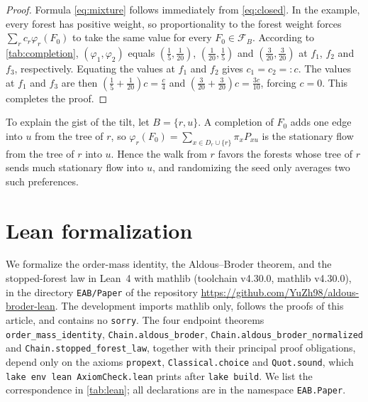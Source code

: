 \documentclass[onefignum,onetabnum]{siamart250211}
\numberwithin{theorem}{section}
\numberwithin{equation}{section}
\begin{document}
\begin{proof}
Formula \eqref{eq:mixture} follows immediately from \eqref{eq:closed}. In the example, every forest
has positive weight, so proportionality to the forest weight forces
$\sum_rc_r\varphi_r(F_0)$ to take the same value for every $F_0\in\mathcal F_B$. According to \cref{tab:completion}, $(\varphi_1,\varphi_2)$ equals
$(\tfrac15,\tfrac1{20})$, $(\tfrac1{20},\tfrac15)$ and
$(\tfrac3{20},\tfrac3{20})$ at $f_1$, $f_2$ and $f_3$, respectively. Equating the values at $f_1$ and
$f_2$ gives $c_1=c_2=:c$. The values at $f_1$ and $f_3$ are then
$(\tfrac15+\tfrac1{20})c=\tfrac c4$ and $(\tfrac3{20}+\tfrac3{20})c=\tfrac{3c}{10}$, forcing $c=0$. This completes the proof.
\end{proof}

To explain the gist of the tilt, let $B=\{r,u\}$. A completion of $F_0$ adds one
edge into $u$ from the tree of $r$, so
$\varphi_r(F_0)=\sum_{x\in D_r\cup\{r\}}\pi_xP_{xu}$ is the stationary
flow from the tree of $r$ into $u$. Hence the walk from $r$ favors the
forests whose tree of $r$ sends much stationary flow into $u$, and
randomizing the seed only averages two such preferences.

\section{Lean formalization}\label{sec:sm-lean}

\begin{sloppypar}
We formalize the order-mass identity, the Aldous--Broder theorem,
and the stopped-forest law in Lean~4
\cite{deMouraUllrich2021} with mathlib \cite{mathlib2020} (toolchain
v4.30.0, mathlib v4.30.0), in the directory \texttt{EAB/Paper}
of the repository \url{https://github.com/YuZh98/aldous-broder-lean}. The development imports mathlib only,
follows the proofs of this article, and contains no \texttt{sorry}. The four endpoint theorems \texttt{order\_mass\_identity},
\texttt{Chain.aldous\_broder}, \texttt{Chain.aldous\_broder\_normalized}
and \texttt{Chain.stopped\_forest\_law}, together with their principal
proof obligations, depend only on the axioms \texttt{propext},
\texttt{Classical.choice} and \texttt{Quot.sound}, which
\texttt{lake env lean AxiomCheck.lean} prints after \texttt{lake build}.
We list the correspondence in \cref{tab:lean}; all declarations are in
the namespace \texttt{EAB.Paper}.
\end{sloppypar}
\end{document}
